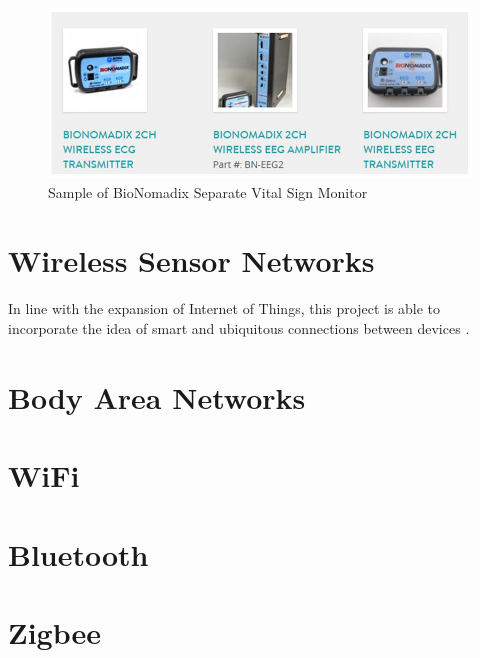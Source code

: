 \begin{figure}[H]
	\centering
	\includegraphics[width=\linewidth]{lit5.jpg}
	\caption{Sample of BioNomadix Separate Vital Sign Monitor \cite{lit10}}
	\label{literaturereview5}
\end{figure}






\section{Wireless Sensor Networks}

In line with the expansion of Internet of Things, this project is able to incorporate the idea of smart and ubiquitous connections between devices \cite{gubbi2013internet}.

\section{Body Area Networks}



\section{WiFi}

\section{Bluetooth}

\section{Zigbee}
